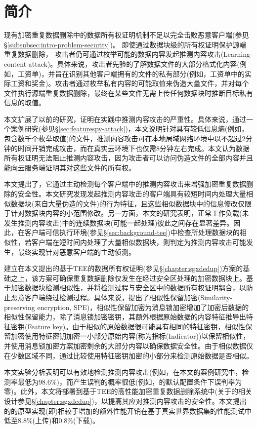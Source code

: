\section{简介}
\label{sec:featurespy-intro}

现有加密重复数据删除中的数据所有权证明机制不足以完全击败恶意客户端(参见\S\ref{subsubsec:intro-problem-security})。 即使通过数据块级的所有权证明保护源端重复数据删除， 攻击者仍可通过枚举可能的数据内容发起推测内容攻击(Learning-content attack)。具体来说，攻击者先验的了解数据文件的大部分格式化内容(例如，工资单)，并旨在识别其他客户端拥有的文件的私有部分(例如，工资单中的实际工资和奖金)。攻击者通过枚举私有内容的可能取值来伪造大量文件，并对每个文件执行源端重复数据删除，最终在某些文件无需上传任何数据块时推断目标私有信息的取值。

本文扩展了以前的研究，证明在实践中推测内容攻击的严重性。具体来说，通过一个案例研究(参见\S\ref{sec:featurespy-attack})，本文说明针对具有较低信息熵(例如，包含数千个枚举取值)的文件，推测内容攻击可在本地局域网络环境中以不超过2分钟的时间开销完成攻击，而在真实云环境下也仅需8分钟左右完成。本文认为数据所有权证明无法阻止推测内容攻击，因为攻击者可以访问伪造文件的全部内容并且能向云服务端证明其对这些文件的所有权。

本文提出了\sysnameF，它通过主动检测每个客户端中的推测内容攻击来增强加密重复数据删除的安全性。本文研究发现发起推测内容攻击的客户端具有较短时间内处理大量相似数据块(来自大量伪造的文件)的行为特征，且这些相似数据块中的信息修改仅限于针对数据块内容的小范围修改。另一方面，本文的研究表明，正常工作负载(未发生推测内容攻击)中的连续数据块(可能一起处理)彼此之间存在显著差异。因此，\sysnameF 在客户端可信执行环境(参见\S\ref{sec:background-tee})中检查所处理数据块的相似性，若客户端在短时间内处理了大量相似数据块，则判定为推测内容攻击可能发生，最终实现针对恶意客户端的主动侦测。

\sysnameF 建立在本文提出的基于TEE的数据所有权证明(参见\S\ref{chapter:sgxdedup})方案的基础之上，该方案可确保重复数据删除仅发生在经过安全区处理的加密数据块上。\sysnameF 基于加密数据块检测相似性，并将检测过程与安全区中的数据所有权证明耦合，以防止恶意客户端绕过检测过程。具体来说，\sysnameF 提出了相似性保留加密(Similarity-preserving
encryption, SPE)，相似性保留加密为消息锁加密增加了加密后数据的相似性保留能力，除了消息锁加密密钥，其额外根据原始数据的内容特征推导出特征密钥(Feature key)。由于相似的原始数据很可能具有相同的特征密钥，相似性保留加密使用特征密钥加密一小部分原始内容(称为指标(Indicator))以保留相似性，并使用消息锁加密方案加密剩余的大部分内容以确保数据安全性。由于相似数据仅在少数区域不同，\sysnameF 通过比较使用特征密钥加密的小部分来检测原始数据是否相似。

本文实验分析表明\sysnameF 可以有效地检测推测内容攻击(例如，在本文的案例研究中，检测率最低为98.6\%)，而产生误判的概率很低(例如，\sysnameF 的默认配置条件下误判率为零)。此外，本文将\sysnameF 部署到基于TEE的高性能加密重复数据删除系统\sysnameS 中(关于\sysnameS 的相关设计参见\S\ref{chapter:sgxdedup})，以提高其应对推测内容攻击的安全性。本文提出的\sysnameF 的原型实现(即\prototype)相较于\sysnameS 增加的额外性能开销在基于真实世界数据集的性能测试中低至8.8\%(上传)和0.8\%(下载)。